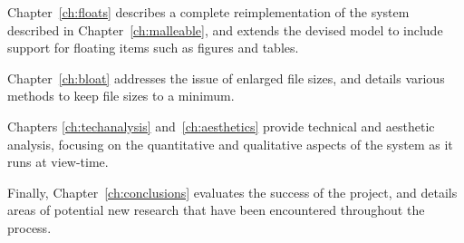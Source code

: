 Chapter~\ref{ch:floats} describes a complete reimplementation of the system described in Chapter~\ref{ch:malleable}, and extends the devised model to include support for floating items such as figures and tables.

Chapter~\ref{ch:bloat} addresses the issue of enlarged file sizes, and details various methods to keep file sizes to a minimum.

Chapters \ref{ch:techanalysis} and~\ref{ch:aesthetics} provide technical and aesthetic analysis, focusing on the quantitative and qualitative aspects of the system as it runs at view-time.

Finally, Chapter~\ref{ch:conclusions} evaluates the success of the project, and details areas of potential new research that have been encountered throughout the process.
